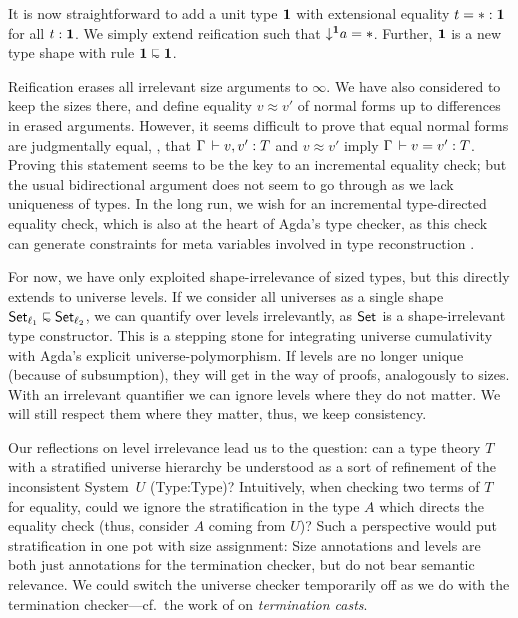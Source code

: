 \documentclass[acmlarge,review,anonymous]{acmart}\settopmatter{printfolios=true}
\begin{document}
It is now straightforward to add a unit type $\mathbf{1}$ with extensional equality $t = {*} : \mathbf{1}$ for all $t : \mathbf{1}$.  We simply extend reification such that $\mathord{\downarrow^{\mathbf{1}}} a = {*}$.  Further, $\mathbf{1}$ is a new type shape with rule $\One \shape \One$.

Reification erases all irrelevant size arguments to $\infty$.  We have also considered to keep the sizes there, and define equality $v \approx v'$ of normal forms up to differences in erased arguments.  However, it seems difficult to prove that equal normal forms are judgmentally equal, \ie, that $\Gamma \,\vdash v,v' : T$ and $v \approx v'$ imply $\Gamma \,\vdash v = v' : T$.  Proving this statement seems to be the key to an incremental equality check; but
the usual bidirectional argument \cite{abelScherer:types10} does not seem to go through as we lack uniqueness of types.
In the long run, we wish for an incremental type-directed equality check, which is also at the heart of Agda's type checker, as this check can generate constraints for meta variables involved in type reconstruction \cite{norell:PhD}.

For now, we have only exploited shape-irrelevance of sized types, but this directly extends to universe levels.  If we consider all universes as a single shape $\Set[\ell_1] \shape \Set[\ell_2]$, we can quantify over levels irrelevantly, as $\mathsf{Set}_{}$ is a shape-irrelevant type constructor.  This is a stepping stone for integrating universe cumulativity with Agda's explicit universe-polymorphism.  If levels are no longer unique (because of subsumption), they will get in the way of proofs, analogously to sizes.  With an irrelevant quantifier we can ignore levels where they do not matter.  We will still respect them where they matter, thus, we keep consistency.

Our reflections on level irrelevance lead us to the question: can a type theory $T$ with a stratified universe hierarchy be understood as a sort of refinement of the inconsistent System~$U$ (Type:Type)?  Intuitively, when checking two terms of $T$ for equality, could we ignore the stratification in the type $A$ which directs the equality check (thus, consider $A$ coming from $U$)?
Such a perspective would put stratification in one pot with size assignment:  Size annotations and levels are both just annotations for the termination checker, but do not bear semantic relevance.  We could switch the universe checker temporarily off as we do with the termination checker---cf.\ the work of \citet{stumpSjobergWeirich:par10} on \emph{termination casts}.
\end{document}
